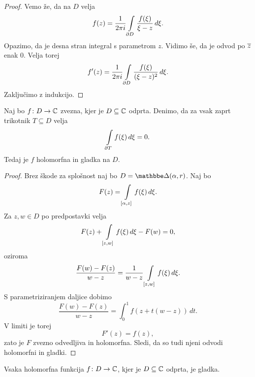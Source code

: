 \begin{proof}
Vemo že, da na $D$ velja
\[
f(z) =
\frac{1}{2 \pi i} \int\limits_{\partial D} \frac{f(\xi)}{\xi - z}\,d\xi.
\]
Opazimo, da je desna stran integral s parametrom $z$. Vidimo še, da
je odvod po $\overline{z}$ enak $0$. Velja torej
\[
f'(z) = \frac{1}{2 \pi i}
\int\limits_{\partial D} \frac{f(\xi)}{(\xi - z)^2}\,d\xi.
\]
Zaključimo z indukcijo.
\end{proof}

\begin{izrek}[Morera]\label{iz:mor}
Naj bo $f \colon D \to \mathbb{C}$ zvezna, kjer je $D \subseteq \mathbb{C}$ odprta.
Denimo, da za vsak zaprt trikotnik $T \subseteq D$ velja
\[
\int\limits_{\partial T} f(\xi)\,d\xi = 0.
\]
Tedaj je $f$ holomorfna in gladka na $D$.
\end{izrek}

\begin{proof}
Brez škode za splošnost naj bo $D = \dsk(\alpha, r)$. Naj bo
\[
F(z) = \int\limits_{[\alpha, z]} f(\xi)\,d\xi.
\]
Za $z, w \in D$ po predpostavki velja
\[
F(z) + \int\limits_{[z, w]} f(\xi)\,d\xi - F(w) = 0,
\]
oziroma
\[
\frac{F(w) - F(z)}{w - z} =
\frac{1}{w - z} \int\limits_{[z, w]} f(\xi)\,d\xi.
\]
S parametriziranjem daljice dobimo
\[
\frac{F(w) - F(z)}{w - z} = \int_0^1 f(z + t(w - z))\,dt.
\]
V limiti je torej
\[
F'(z) = f(z),
\]
zato je $F$ zvezno odvedljiva in holomorfna. Sledi, da so tudi
njeni odvodi holomorfni in gladki.
\end{proof}

\begin{izrek}[Goursat]
Vsaka holomorfna funkcija $f \colon D \to \mathbb{C}$, kjer je
$D \subseteq \mathbb{C}$ odprta, je gladka.
\end{izrek}

